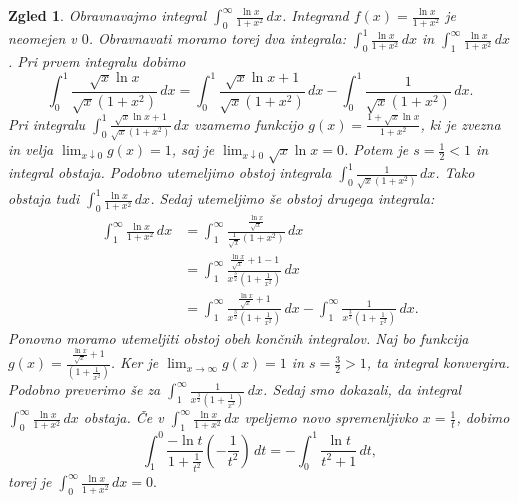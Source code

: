 \documentclass[10pt, a4paper]{article}
\newtheorem{zgled}[izr]{Zgled}
\newcommand{\limf}[3]{\lim_{#1 \to #2} {#3}}
\newcommand{\rlimf}[3]{\lim_{#1 \downarrow #2} {#3}}
\begin{document}
\begin{zgled}
    Obravnavajmo integral $\int_0 ^\infty \frac{\ln x}{1 + x^2}\,dx$.
    Integrand $f(x) = \frac{\ln x}{1 + x^2}$ je neomejen v $0$.
    Obravnavati moramo torej dva integrala: $\int_0 ^1 \frac{\ln x}{1 + x^2}\,dx$ in $\int_1 ^\infty \frac{\ln x}{1 + x^2}\,dx$. 
    Pri prvem integralu dobimo $$\int_0 ^1 \frac{\sqrt{x} \ln x}{\sqrt{x} (1 + x^2)}\,dx = \int_0 ^1 \frac{\sqrt{x} \ln x + 1}{\sqrt{x} (1 + x^2)}\,dx - \int_0 ^1 \frac{1}{\sqrt{x} (1 + x^2)}\,dx.$$
    Pri integralu $\int_0 ^1 \frac{\sqrt{x} \ln x + 1}{\sqrt{x} (1 + x^2)}\,dx$ vzamemo funkcijo $g(x) = \frac{1+ \sqrt{x} \ln x}{1 + x^2}$, ki je zvezna in velja $\rlimf{x}{0}{g(x)} = 1$, saj je $\rlimf{x}{0}{\sqrt{x} \ln x} = 0$. 
    Potem je $s = \frac{1}{2} < 1$ in integral obstaja.
    Podobno utemeljimo obstoj integrala $\int_0 ^1 \frac{1}{\sqrt{x} (1 + x^2)}\,dx$.
    Tako obstaja tudi $\int_0 ^1 \frac{\ln x}{1 + x^2}\,dx$.
    Sedaj utemeljimo še obstoj drugega integrala:
    \begin{align*}
        \int_1 ^\infty \frac{\ln x}{1 + x^2}\,dx &= \int_1 ^\infty \frac{\frac{\ln x}{\sqrt{x}}}{\frac{1}{\sqrt{x}} (1 + x^2)}\,dx\\
        &= \int_1 ^\infty \frac{\frac{\ln x}{\sqrt{x}} + 1 - 1}{x^{\frac{3}{2}} (1 + \frac{1}{x^2})}\,dx\\
        &= \int_1 ^\infty \frac{\frac{\ln x}{\sqrt{x}} + 1}{x^{\frac{3}{2}} (1 + \frac{1}{x^2})}\,dx - \int_1 ^\infty \frac{1}{x^{\frac{3}{2}} (1 + \frac{1}{x^2})}\,dx.
    \end{align*}
    Ponovno moramo utemeljiti obstoj obeh končnih integralov.
    Naj bo funkcija $g(x) = \frac{\frac{\ln x}{\sqrt{x}} + 1}{(1 + \frac{1}{x^2})}$. Ker je $\limf{x}{\infty}{g(x)} = 1$ in $s = \frac{3}{2} > 1$, ta integral konvergira.
    Podobno preverimo še za $\int_1 ^\infty \frac{1}{x^{\frac{3}{2}} (1 + \frac{1}{x^2})}\,dx$. Sedaj smo dokazali, da integral $\int_0 ^\infty \frac{\ln x}{1 + x^2}\,dx$ obstaja.
    Če v $\int_1 ^\infty \frac{\ln x}{1 + x^2}\,dx$ vpeljemo novo spremenljivko $x = \frac{1}{t}$, dobimo $$\int_1 ^0 \frac{- \ln t}{1 + \frac{1}{t^2}} (-\frac{1}{t^2})\,dt = - \int_0 ^1 \frac{\ln t}{t^2 + 1}\,dt,$$
    torej je $\int_0 ^\infty \frac{\ln x}{1 + x^2}\,dx = 0.$
\end{zgled}
\end{document}
